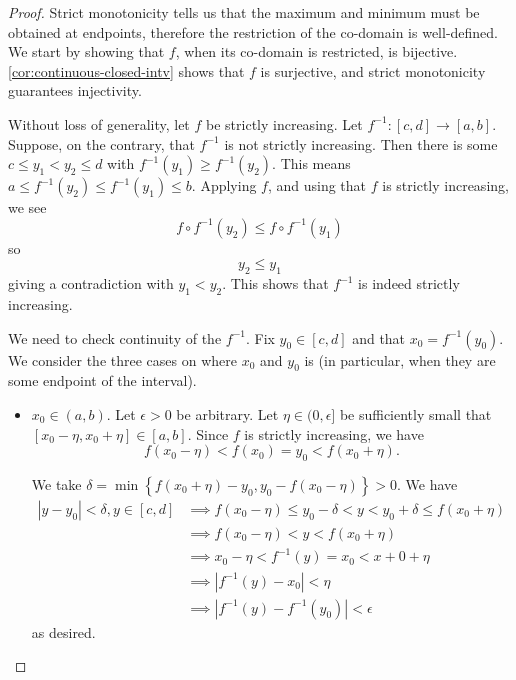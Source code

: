 \documentclass[11pt]{article}
\numberwithin{equation}{section}
\theoremstyle{definition}
\theoremstyle{remark}
\newcommand{\pqty}[1]{\left(#1\right)}
\newcommand{\Bqty}[1]{\left\{#1\right\}}
\newcommand{\abs}[1]{\left|#1\right|}
\newcommand{\ccintv}[2]{[#1,#2]}
\newcommand{\oointv}[2]{(#1,#2)}
\newcommand{\ocintv}[2]{(#1,#2]}
\newcommand{\functiondomain}[3]{#1:#2\to #3}
\newcommand{\inverse}{^{-1}}
\begin{document}
\begin{proof}
    Strict monotonicity tells us that the maximum and minimum must be obtained at endpoints, therefore the restriction of the co-domain is well-defined. We start by showing that \(f\), when its co-domain is restricted, is bijective. \autoref{cor:continuous-closed-intv} shows that \(f\) is surjective, and strict monotonicity guarantees injectivity.

    Without loss of generality, let \(f\) be strictly increasing. Let \(\functiondomain{f\inverse}{\ccintv{c}{d}}{\ccintv{a}{b}}\). Suppose, on the contrary, that \(f\inverse\) is not strictly increasing. Then there is some \(c \leq y_1 < y_2 \leq d\) with \(f\inverse\pqty{y_1} \geq f\inverse\pqty{y_2}\). This means \(a \leq f\inverse\pqty{y_2} \leq f\inverse\pqty{y_1} \leq b\). Applying \(f\), and using that \(f\) is strictly increasing, we see
    \[
        f \circ f\inverse\pqty{y_2} \leq f \circ f\inverse\pqty{y_1}
    \]
    so
    \[
        y_2 \leq y_1
    \]
    giving a contradiction with \(y_1 < y_2\). This shows that \(f\inverse\) is indeed strictly increasing.

    We need to check continuity of the \(f\inverse\). Fix \(y_0 \in \ccintv{c}{d}\) and that \(x_0 = f\inverse\pqty{y_0}\). We consider the three cases on where \(x_0\) and \(y_0\) is (in particular, when they are some endpoint of the interval).

    \begin{itemize}
        \item \(x_0 \in \oointv{a}{b}\). Let \(\epsilon > 0\) be arbitrary. Let \(\eta \in \ocintv{0}{\epsilon}\) be sufficiently small that \(\ccintv{x_0 - \eta}{x_0 + \eta} \in \ccintv{a}{b}\). Since \(f\) is strictly increasing, we have
        \[
            f\pqty{x_0 - \eta} < f\pqty{x_0} = y_0 < f\pqty{x_0 + \eta}.
        \]

        We take \(\delta = \min\Bqty{f\pqty{x_0 + \eta} - y_0, y_0 - f\pqty{x_0 - \eta}} > 0\). We have
        \begin{align*}
            \abs{y - y_0} < \delta, y \in \ccintv{c}{d} &\implies f\pqty{x_0 - \eta} \leq y_0 - \delta < y < y_0 + \delta \leq f\pqty{x_0 + \eta} \\
            &\implies f\pqty{x_0 - \eta} < y < f\pqty{x_0 + \eta} \\
            &\implies x_0 - \eta < f\inverse\pqty{y} = x_0 < x+0 + \eta \\
            &\implies \abs{f\inverse\pqty{y} - x_0} < \eta \\
            &\implies \abs{f\inverse\pqty{y} - f\inverse\pqty{y_0}} < \epsilon
        \end{align*}
        as desired.


\end{itemize}
\end{proof}
\end{document}

